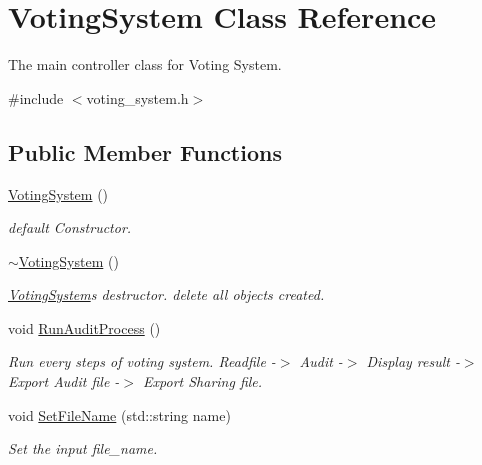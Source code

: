 \hypertarget{classVotingSystem}{}\section{Voting\+System Class Reference}
\label{classVotingSystem}


The main controller class for Voting System.  




{\ttfamily \#include $<$voting\+\_\+system.\+h$>$}

\subsection*{Public Member Functions}
\begin{DoxyCompactItemize}
\item 
\mbox{\label{classVotingSystem_ab8f928f5da75818aef2de0a82e97c823}} 
\hyperlink{classVotingSystem_ab8f928f5da75818aef2de0a82e97c823}{Voting\+System} ()
\begin{DoxyCompactList}\small\item\em default Constructor. \end{DoxyCompactList}\item 
\mbox{\label{classVotingSystem_a6563912c8fd1847d9aeaaf8d33a9b177}} 
\hyperlink{classVotingSystem_a6563912c8fd1847d9aeaaf8d33a9b177}{$\sim$\+Voting\+System} ()
\begin{DoxyCompactList}\small\item\em \hyperlink{classVotingSystem}{Voting\+System}\textquotesingle{}s destructor. {\ttfamily delete} all objects created. \end{DoxyCompactList}\item 
\mbox{\label{classVotingSystem_a4d3e2adccbfae16eb4d17dd46d682074}} 
void \hyperlink{classVotingSystem_a4d3e2adccbfae16eb4d17dd46d682074}{Run\+Audit\+Process} ()
\begin{DoxyCompactList}\small\item\em Run every steps of voting system. Readfile -\/$>$ Audit -\/$>$ Display result -\/$>$ Export Audit file -\/$>$ Export Sharing file. \end{DoxyCompactList}\item 
void \hyperlink{classVotingSystem_a4c6d3ece9023dc618100fa65a536ccf5}{Set\+File\+Name} (std\+::string name)
\begin{DoxyCompactList}\small\item\em Set the input file\+\_\+name. \end{DoxyCompactList}\item 

\end{DoxyCompactItemize}
